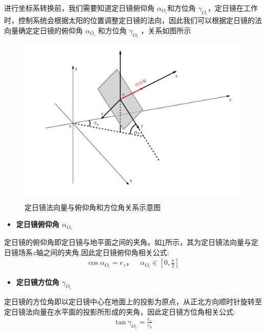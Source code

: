 \documentclass[../main.tex]{subfiles}
\begin{document}
\par 进行坐标系转换前，我们需要知道定日镜俯仰角 $\alpha_{O_{i}}$和方位角 $\gamma_{O_{i}}$，定日镜在工作时，控制系统会根据太阳的位置调整定日镜的法向，因此我们可以根据定日镜的法向量确定定日镜的俯仰角 $\alpha_{O_{i}}$ 和方位角 $\gamma_{O_{i}}$ ，关系如图所示
   \begin{figure}[H]
    \centering
    \includegraphics[width=.8\textwidth]{4}
    \caption{定日镜法向量与俯仰角和方位角关系示意图}
    \label{1.12}
\end{figure} 


\begin{itemize}
\item \textbf{定日镜俯仰角 $\alpha_{O_{i}}$ }
\end{itemize}
\par 定日镜的俯仰角即定日镜与地平面之间的夹角。如\cref{1.12}所示，其为定日镜法向量与定日镜场系$z$轴之间的夹角,因此定日镜俯仰角相关公式:
\begin{align}    \label{1.13}
\cos\alpha_{O_i} = e_z，\quad \alpha_{O_{i}} \in [0, \frac{\pi}{2}]
\end{align}

\begin{itemize}
  \item \textbf{定日镜方位角 $\gamma_{O_{i}}$  }
  \end{itemize}
  \par 定日镜的方位角即以定日镜中心在地面上的投影为原点，从正北方向顺时针旋转至定日镜法向量在水平面的投影所形成的夹角，因此定日镜方位角相关公式:
    \begin{align}    \label{1.14}
\tan\gamma_{O_i} = \frac{e_{x}}{e_{y}}
\end{align}               
\end{document}
